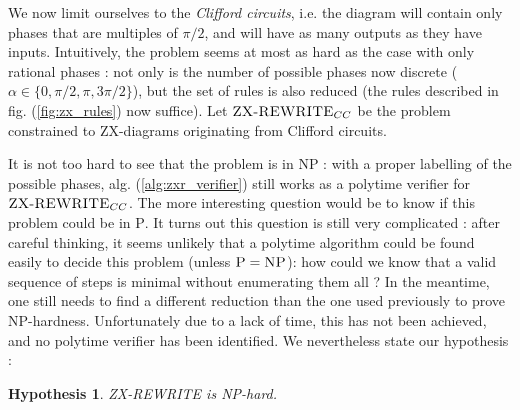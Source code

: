 \documentclass[journal,onecolumn]{IEEEtran}
\newtheorem{hypothesis}[theorem]{Hypothesis}
\begin{document}
We now limit ourselves to the \textit{Clifford circuits}, i.e. the diagram will contain only phases that are multiples of $\pi / 2$, and will have as many outputs as they have inputs. Intuitively, the problem seems at most as hard as the case with only rational phases : not only is the number of possible phases now discrete ($\alpha \in \{0, \pi / 2, \pi, 3 \pi / 2\}$), but the set of rules is also reduced (the rules described in fig. (\ref{fig:zx_rules}) now suffice). Let $\textsc{ZX-REWRITE}_{CC}$ be the problem constrained to ZX-diagrams originating from Clifford circuits.

It is not too hard to see that the problem is in \textsc{NP} : with a proper labelling of the possible phases, alg. (\ref{alg:zxr_verifier}) still works as a polytime verifier for $\textsc{ZX-REWRITE}_{CC}$. The more interesting question would be to know if this problem could be in \textsc{P}. It turns out this question is still very complicated : after careful thinking, it seems unlikely that a polytime algorithm could be found easily to decide this problem (unless $\textsc{P} = \textsc{NP}$): how could we know that a valid sequence of steps is minimal without enumerating them all ? In the meantime, one still needs to find a different reduction than the one used previously to prove \textsc{NP}-hardness. Unfortunately due to a lack of time, this has not been achieved, and no polytime verifier has been identified. We nevertheless state our hypothesis :

\begin{hypothesis}
	\textsc{ZX-REWRITE} is \textsc{NP}-hard.
\end{hypothesis}

%
%
\end{document}
